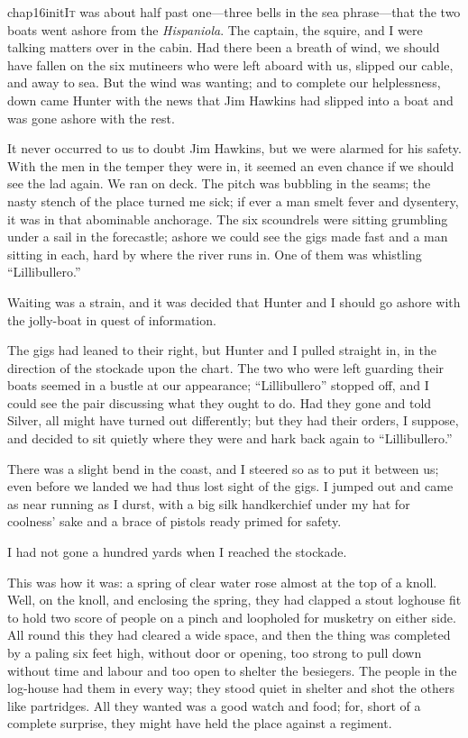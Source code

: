 
   \lettrine[lines=4,image=true]{chap16initI}{t} was about half past one---three bells in the sea phrase---that the two boats went ashore from the \textit{Hispaniola}. The captain, the squire, and I were talking matters over in the cabin. Had there been a breath of wind, we should have fallen on the six mutineers who were left aboard with us, slipped our cable, and away to sea. But the wind was wanting; and to complete our helplessness, down came Hunter with the news that Jim Hawkins had slipped into a boat and was gone ashore with the rest.

It never occurred to us to doubt Jim Hawkins, but we were alarmed for his safety. With the men in the temper they were in, it seemed an even chance if we should see the lad again. We ran on deck. The pitch was bubbling in the seams; the nasty stench of the place turned me sick; if ever a man smelt fever and dysentery, it was in that abominable anchorage. The six scoundrels were sitting grumbling under a sail in the forecastle; ashore we could see the gigs made fast and a man sitting in each, hard by where the river runs in. One of them was whistling \enquote{Lillibullero.}

Waiting was a strain, and it was decided that Hunter and I should go ashore with the jolly-boat in quest of information.

The gigs had leaned to their right, but Hunter and I pulled straight in, in the direction of the stockade upon the chart. The two who were left guarding their boats seemed in a bustle at our appearance; \enquote{Lillibullero} stopped off, and I could see the pair discussing what they ought to do. Had they gone and told Silver, all might have turned out differently; but they had their orders, I suppose, and decided to sit quietly where they were and hark back again to \enquote{Lillibullero.}

There was a slight bend in the coast, and I steered so as to put it between us; even before we landed we had thus lost sight of the gigs. I jumped out and came as near running as I durst, with a big silk handkerchief under my hat for coolness’ sake and a brace of pistols ready primed for safety.

I had not gone a hundred yards when I reached the stockade.

This was how it was: a spring of clear water rose almost at the top of a knoll. Well, on the knoll, and enclosing the spring, they had clapped a stout loghouse fit to hold two score of people on a pinch and loopholed for musketry on either side. All round this they had cleared a wide space, and then the thing was completed by a paling six feet high, without door or opening, too strong to pull down without time and labour and too open to shelter the besiegers. The people in the log-house had them in every way; they stood quiet in shelter and shot the others like partridges. All they wanted was a good watch and food; for, short of a complete surprise, they might have held the place against a regiment.

